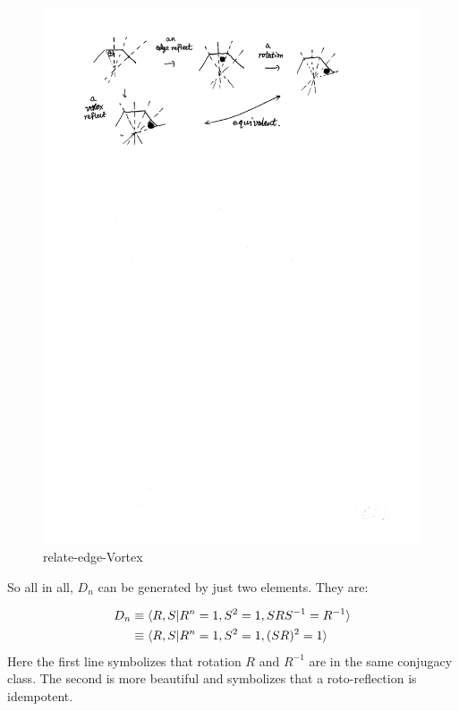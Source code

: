 \begin{figure}[H]
    \centering
    \includegraphics[width=0.8\linewidth]{scans/relate-edge-vortex.pdf}
    \caption{relate-edge-Vortex}
\end{figure}
So all in all, $D_n$ can be generated by just two elements. They are:
\begin{fact}
\label{fact:point-group-formal-def-dn}
\begin{align}
    D_n &\equiv \braket{R,S|R^n=1,S^2=1,SRS^{-1}=R^{-1}} \\
        &\equiv \braket{R,S|R^n=1,S^2=1,(SR)^2=1}
\end{align}
Here the first line symbolizes that rotation $R$ and $R^{-1}$ are in
the same conjugacy class. The second is more beautiful and symbolizes
that a roto-reflection is idempotent.
\end{fact}

